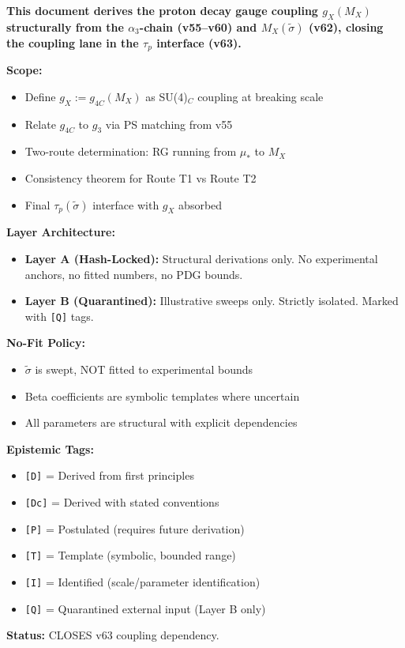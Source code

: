 \documentclass[11pt,a4paper]{article}
\newcommand{\tagD}{\textcolor{green!50!black}{\texttt{[D]}}}
\newcommand{\tagDc}{\textcolor{blue!70!black}{\texttt{[Dc]}}}
\newcommand{\tagP}{\textcolor{orange!80!black}{\texttt{[P]}}}
\newcommand{\tagQ}{\textcolor{red!70!black}{\texttt{[Q]}}}
\newcommand{\tagI}{\textcolor{purple!70!black}{\texttt{[I]}}}
\newcommand{\tagT}{\textcolor{cyan!70!black}{\texttt{[T]}}}
\theoremstyle{definition}
\begin{document}
\begin{readercontract}
\textbf{This document derives the proton decay gauge coupling $g_X(M_X)$
structurally from the $\alpha_3$-chain (v55--v60) and $M_X(\tilde{\sigma})$ (v62),
closing the coupling lane in the $\tau_p$ interface (v63).}

\textbf{Scope:}
\begin{itemize}
  \item Define $g_X := g_{4C}(M_X)$ as SU(4)$_C$ coupling at breaking scale
  \item Relate $g_{4C}$ to $g_3$ via PS matching from v55
  \item Two-route determination: RG running from $\mu_*$ to $M_X$
  \item Consistency theorem for Route T1 vs Route T2
  \item Final $\tau_p(\tilde{\sigma})$ interface with $g_X$ absorbed
\end{itemize}

\textbf{Layer Architecture:}
\begin{itemize}
  \item \textbf{Layer A (Hash-Locked):} Structural derivations only. No experimental
        anchors, no fitted numbers, no PDG bounds.
  \item \textbf{Layer B (Quarantined):} Illustrative sweeps only.
        Strictly isolated. Marked with \tagQ{} tags.
\end{itemize}

\textbf{No-Fit Policy:}
\begin{itemize}
  \item $\tilde{\sigma}$ is swept, NOT fitted to experimental bounds
  \item Beta coefficients are symbolic templates where uncertain
  \item All parameters are structural with explicit dependencies
\end{itemize}

\textbf{Epistemic Tags:}
\begin{itemize}
  \item \tagD{} = Derived from first principles
  \item \tagDc{} = Derived with stated conventions
  \item \tagP{} = Postulated (requires future derivation)
  \item \tagT{} = Template (symbolic, bounded range)
  \item \tagI{} = Identified (scale/parameter identification)
  \item \tagQ{} = Quarantined external input (Layer B only)
\end{itemize}

\textbf{Status:} CLOSES v63 coupling dependency.
\end{readercontract}
\end{document}
